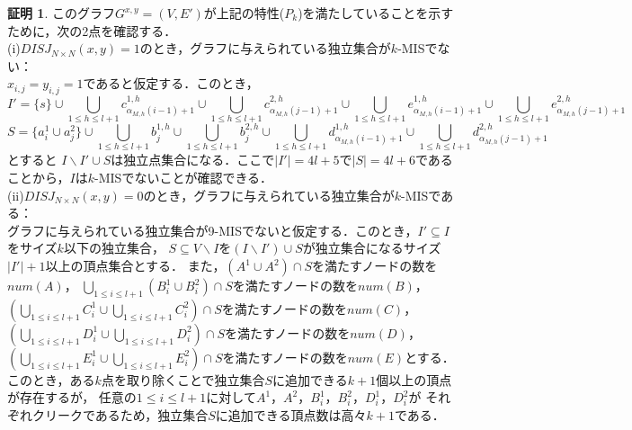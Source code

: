 \documentclass[12pt]{thesis}
\theoremstyle{definition}
\newtheorem*{prf*}{証明}
\begin{document}
\begin{prf*}
このグラフ$G^{x, y} = (V, E')$が上記の特性($P_{k}$)を満たしていることを示すために，次の2点を確認する． \\
(i)$DISJ_{N \times N} (x, y) = 1$のとき，グラフに与えられている独立集合が$k$-MISでない： \\
$x_{i,j}=y_{i,j}=1$であると仮定する．このとき，
\begin{dmath*}
I'=\{s\} \cup \bigcup_{1\leq h \leq l+1}c^{1,h}_{\alpha_{M,h}(i-1)+1} \cup 
\bigcup_{1\leq h \leq l+1}c^{2,h}_{\alpha_{M,h}(j-1)+1} \cup 
\bigcup_{1\leq h \leq l+1}e^{1,h}_{\alpha_{M,h}(i-1)+1} \cup 
\bigcup_{1\leq h \leq l+1}e^{2,h}_{\alpha_{M,h}(j-1)+1}
\end{dmath*}
\begin{dmath*}
S=\{a^{1}_{i} \cup a^{2}_{j}\} \cup 
\bigcup_{1\leq h \leq l+1}b^{1,h}_{j} \cup 
\bigcup_{1\leq h \leq l+1}b^{2,h}_{j} \cup 
\bigcup_{1\leq h \leq l+1}d^{1,h}_{\alpha_{M,h}(i-1)+1} \cup  
\bigcup_{1\leq h \leq l+1}d^{2,h}_{\alpha_{M,h}(j-1)+1}
\end{dmath*}
とすると
$I \backslash I' \cup S$は独立点集合になる．ここで$|I'|=4l+5$で$|S|=4l+6$であることから，$I$は$k$-MISでないことが確認できる． \\
(ii)$DISJ_{N \times N} (x, y) = 0$のとき，グラフに与えられている独立集合が$k$-MISである： \\ 
グラフに与えられている独立集合が9-MISでないと仮定する．このとき，$I'\subseteq I$をサイズ$k$以下の独立集合，
$S\subseteq V\backslash I$を$(I \backslash I') \cup S$が独立集合になるサイズ$|I'|+1$以上の頂点集合とする．
また，$(A^{1}\cup A^{2}) \cap S$を満たすノードの数を$num(A)$，
$\bigcup_{1\leq i \leq l+1}(B_{i}^{1} \cup B_{i}^{2}) \cap S$を満たすノードの数を$num(B)$，
$\left(\bigcup_{1\leq i \leq l+1}C_{i}^{1} \cup \bigcup_{1\leq i \leq l+1}C_{i}^{2}\right) \cap S$を満たすノードの数を$num(C)$，
$\left(\bigcup_{1\leq i \leq l+1}D_{i}^{1} \cup \bigcup_{1\leq i \leq l+1}D_{i}^{2}\right) \cap S$を満たすノードの数を$num(D)$，\\
$\left(\bigcup_{1\leq i \leq l+1}E_{i}^{1} \cup \bigcup_{1\leq i \leq l+1}E_{i}^{2}\right) \cap S$を満たすノードの数を$num(E)$とする．
このとき，ある$k$点を取り除くことで独立集合$S$に追加できる$k+1$個以上の頂点が存在するが，
任意の$1\leq i \leq l+1$に対して$A^{1}$，$A^{2}$，$B^{1}_{i}$，$B^{2}_{i}$，$D^{1}_{i}$，$D^{2}_{i}$が
それぞれクリークであるため，独立集合$S$に追加できる頂点数は高々$k+1$である．


\end{prf*}
\end{document}
